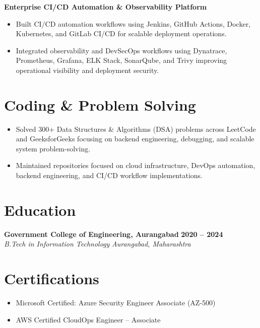 \documentclass[letterpaper,9pt]{article}
\newcommand{\resumeItem}[1]{
\item \small{#1}
}
\newcommand{\resumeSubheading}[4]{
\vspace{1pt}
\textbf{#1} \hfill \textbf{\small #2} \\
\textit{#3} \hfill \textit{\small #4}
\vspace{1pt}
}
\begin{document}
\vspace{1pt}

\textbf{Enterprise CI/CD Automation \& Observability Platform}
\begin{itemize}

\resumeItem{
Built CI/CD automation workflows using Jenkins, GitHub Actions, Docker, Kubernetes, and GitLab CI/CD for scalable deployment operations.
}

\resumeItem{
Integrated observability and DevSecOps workflows using Dynatrace, Prometheus, Grafana, ELK Stack, SonarQube, and Trivy improving operational visibility and deployment security.
}

\end{itemize}


\section{Coding \& Problem Solving}

\begin{itemize}

\resumeItem{
Solved 300+ Data Structures \& Algorithms (DSA) problems across LeetCode and GeeksforGeeks focusing on backend engineering, debugging, and scalable system problem-solving.
}

\resumeItem{
Maintained repositories focused on cloud infrastructure, DevOps automation, backend engineering, and CI/CD workflow implementations.
}

\end{itemize}


\section{Education}

\resumeSubheading
{Government College of Engineering, Aurangabad}{2020 -- 2024}
{B.Tech in Information Technology}{Aurangabad, Maharashtra}


\section{Certifications}

\begin{itemize}

\resumeItem{Microsoft Certified: Azure Security Engineer Associate (AZ-500)}

\resumeItem{AWS Certified CloudOps Engineer -- Associate}

\end{itemize}
\end{document}

